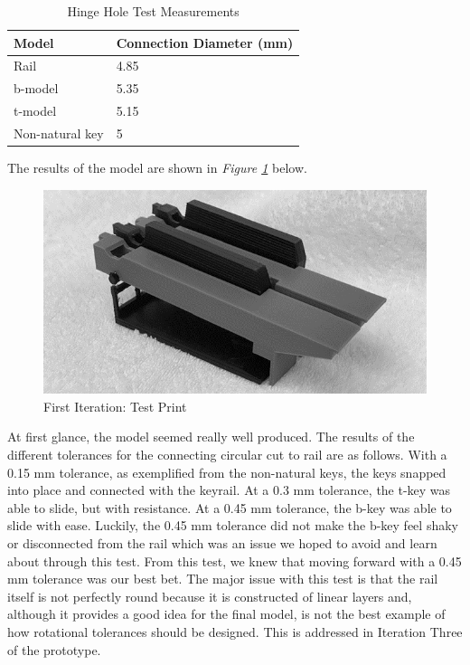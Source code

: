 \begin{table}[]
  \centering
  \begin{tabular}{|l|l|}
    \hline
    Model           & Connection Diameter (mm) \\ \hline
    Rail            & 4.85                     \\ \hline
    b-model         & 5.35                     \\ \hline
    t-model         & 5.15                     \\ \hline
    Non-natural key & 5                        \\ \hline
  \end{tabular}
  \caption{Hinge Hole Test Measurements}
  \label{Tab:connections}
\end{table}

The results of the model are shown in \textit{Figure \ref{fig:print1}} below.

\begin{figure}[h!]
  \centering
  \includegraphics[width=0.8\linewidth]{image/Print1.png}
  \caption{First Iteration: Test Print}
  \label{fig:print1}
\end{figure}

At first glance, the model seemed really well produced. The results of the different tolerances for the connecting circular cut to rail are as follows. With a 0.15 mm tolerance, as exemplified from the non-natural keys, the keys snapped into place and connected with the keyrail. At a 0.3 mm tolerance, the t-key was able to slide, but with resistance. At a 0.45 mm tolerance, the b-key was able to slide with ease. Luckily, the 0.45 mm tolerance did not make the b-key feel shaky or disconnected from the rail which was an issue we hoped to avoid and learn about through this test. From this test, we knew that moving forward with a 0.45 mm tolerance was our best bet. The major issue with this test is that the rail itself is not perfectly round because it is constructed of linear layers and, although it provides a good idea for the final model, is not the best example of how rotational tolerances should be designed. This is addressed in Iteration Three of the prototype.

